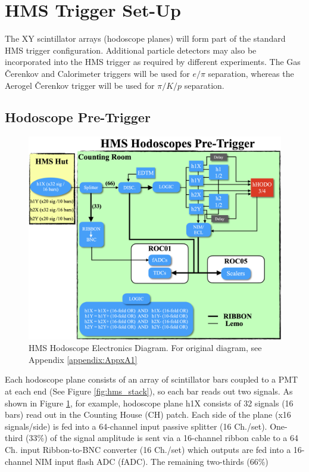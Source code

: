 \documentclass[11pt]{article}
\begin{document}
\newpage
\section{HMS Trigger Set-Up} 
\indent The XY scintillator arrays (hodoscope planes) will form part of the standard HMS trigger configuration.  
Additional particle detectors may also be incorporated into the HMS trigger as required by different experiments. The Gas \v{C}erenkov and Calorimeter triggers will be
used for $e/\pi$ separation, whereas the Aerogel \v{C}erenkov trigger will be used for $\pi/K/p$ separation. 


\subsection{Hodoscope Pre-Trigger}
\begin{figure}[h!]
  \centering
  \includegraphics[scale=0.35]{images/hHODO_diagram.png}
  \caption{HMS Hodoscope Electronics Diagram. For original diagram, see Appendix \ref{appendix:AppxA1}}
  \label{fig:hHODO_diagram}
\end{figure}
\noindent Each hodoscope plane consists of an array of scintillator bars coupled to a PMT at each end (See Figure \ref{fig:hms_stack}), so each bar reads out two signals. As shown in Figure \ref{fig:hHODO_diagram},
for example, hodoscope plane h1X consists of 32 signals (16 bars) read out in the Counting House (CH) patch. Each side of the plane (x16 signals/side) is fed into a 64-channel input passive splitter (16 Ch./set).
One-third (33\%) of the signal amplitude is sent via a 16-channel ribbon cable to a 64 Ch. input Ribbon-to-BNC converter (16 Ch./set) which outputs are fed into a 16-channel NIM input flash ADC (fADC). The remaining two-thirds (66\%)
\end{document}
